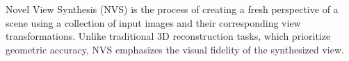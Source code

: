 Novel View Synthesis (NVS) is the process of creating a fresh perspective of a scene 
using a collection of input images and their corresponding view transformations. 
Unlike traditional 3D reconstruction tasks, 
which prioritize geometric accuracy, 
NVS emphasizes the visual fidelity of the synthesized view.
